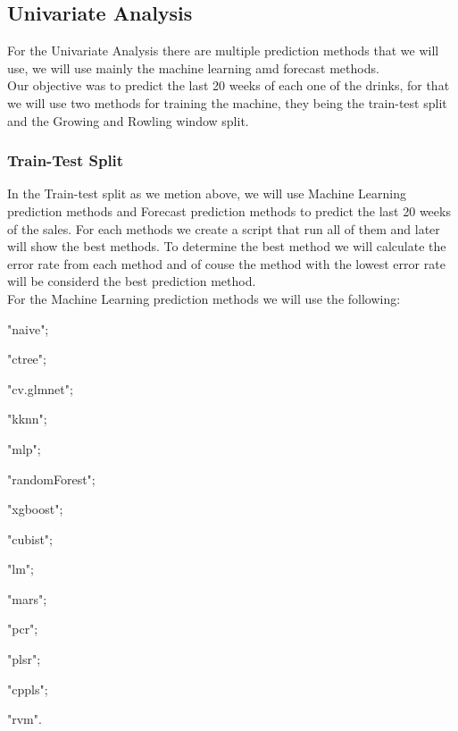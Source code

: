 \newpage
\subsection{Univariate Analysis}

\quad For the Univariate Analysis there are multiple prediction methods that we will use, we will use mainly the machine learning amd forecast methods.\\

Our objective was to predict the last 20 weeks of each one of the drinks, for that we will use two methods for training the machine, they being the train-test split and the Growing and Rowling window split.\\

\subsubsection{Train-Test Split}

\quad In the Train-test split as we metion above, we will use Machine Learning prediction methods and Forecast prediction methods to predict the last 20 weeks of the sales. For each methods we create a script that run all of them and later will show the best methods. To determine the best method we will calculate the error rate from each method and of couse the method with the lowest error rate will be considerd the best prediction method.\\

For the Machine Learning prediction methods we will use the following:

\quad \textbullet "naive";

\quad \textbullet "ctree";

\quad \textbullet "cv.glmnet";

\quad \textbullet "kknn";

\quad \textbullet "mlp";

\quad \textbullet "randomForest";

\quad \textbullet "xgboost";

\quad \textbullet "cubist";

\quad \textbullet "lm";

\quad \textbullet "mars";

\quad \textbullet "pcr";

\quad \textbullet "plsr";

\quad \textbullet "cppls";

\quad \textbullet "rvm".\\

